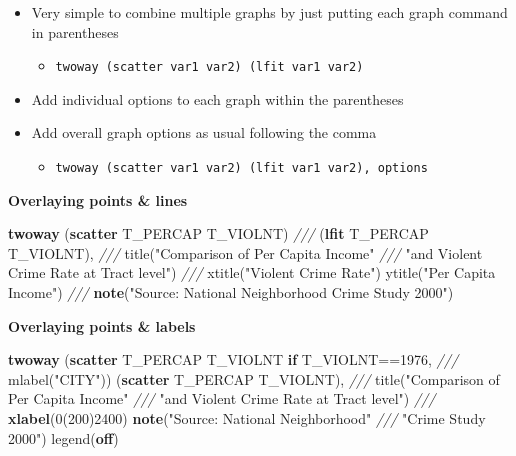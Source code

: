\documentclass[
]{book}
\newenvironment{Shaded}{\begin{snugshade}}{\end{snugshade}}
\newcommand{\BaseNTok}[1]{\textcolor[rgb]{0.00,0.00,0.81}{#1}}
\newcommand{\CommentTok}[1]{\textcolor[rgb]{0.56,0.35,0.01}{\textit{#1}}}
\newcommand{\KeywordTok}[1]{\textcolor[rgb]{0.13,0.29,0.53}{\textbf{#1}}}
\newcommand{\NormalTok}[1]{#1}
\newcommand{\StringTok}[1]{\textcolor[rgb]{0.31,0.60,0.02}{#1}}
\providecommand{\tightlist}{%
  \setlength{\itemsep}{0pt}\setlength{\parskip}{0pt}}
\begin{document}
\begin{itemize}
\tightlist
\item
  Very simple to combine multiple graphs by just putting each graph command in parentheses

  \begin{itemize}
  \tightlist
  \item
    \texttt{twoway\ (scatter\ var1\ var2)\ (lfit\ var1\ var2)}
  \end{itemize}
\item
  Add individual options to each graph within the parentheses
\item
  Add overall graph options as usual following the comma

  \begin{itemize}
  \tightlist
  \item
    \texttt{twoway\ (scatter\ var1\ var2)\ (lfit\ var1\ var2),\ options}
  \end{itemize}
\end{itemize}

\textbf{Overlaying points \& lines}

\begin{Shaded}
\begin{Highlighting}[]
\KeywordTok{twoway}\NormalTok{ (}\KeywordTok{scatter}\NormalTok{ T\_PERCAP T\_VIOLNT) }\CommentTok{///}
\NormalTok{    (}\KeywordTok{lfit}\NormalTok{ T\_PERCAP T\_VIOLNT), }\CommentTok{///}
    \BaseNTok{title}\NormalTok{(}\StringTok{"Comparison of Per Capita Income"} \CommentTok{///}
          \StringTok{"and Violent Crime Rate at Tract level"}\NormalTok{) }\CommentTok{///}
    \BaseNTok{xtitle}\NormalTok{(}\StringTok{"Violent Crime Rate"}\NormalTok{) }\BaseNTok{ytitle}\NormalTok{(}\StringTok{"Per Capita Income"}\NormalTok{) }\CommentTok{///}
    \KeywordTok{note}\NormalTok{(}\StringTok{"Source: National  Neighborhood Crime Study 2000"}\NormalTok{)}
\end{Highlighting}
\end{Shaded}

\textbf{Overlaying points \& labels}

\begin{Shaded}
\begin{Highlighting}[]
\KeywordTok{twoway}\NormalTok{ (}\KeywordTok{scatter}\NormalTok{ T\_PERCAP T\_VIOLNT }\KeywordTok{if}\NormalTok{ T\_VIOLNT==1976, }\CommentTok{///}
    \BaseNTok{mlabel}\NormalTok{(}\StringTok{"CITY"}\NormalTok{)) (}\KeywordTok{scatter}\NormalTok{ T\_PERCAP T\_VIOLNT), }\CommentTok{///}
    \BaseNTok{title}\NormalTok{(}\StringTok{"Comparison of Per Capita Income"} \CommentTok{///}
          \StringTok{"and Violent Crime Rate at Tract level"}\NormalTok{) }\CommentTok{///}
    \KeywordTok{xlabel}\NormalTok{(0(200)2400) }\KeywordTok{note}\NormalTok{(}\StringTok{"Source: National Neighborhood"} \CommentTok{///}
                            \StringTok{"Crime Study 2000"}\NormalTok{) }\BaseNTok{legend}\NormalTok{(}\KeywordTok{off}\NormalTok{)}
\end{Highlighting}
\end{Shaded}
\end{document}
